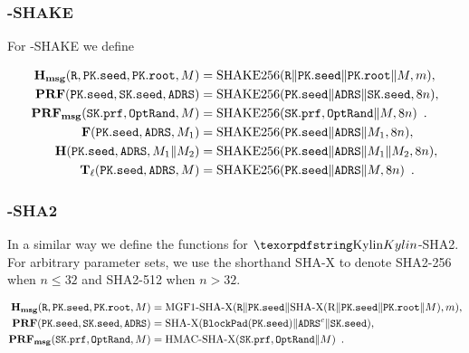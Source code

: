 \begin{table}[ht]
    \caption{Example parameter sets for \SPHINCSA\ targeting different security levels and different tradeoffs between size and speed. Note that these parameter sets have been update for round 3. The column labeled ``bitsec'' gives the bit security computed as described in Section 9; the column labeled ``sec level'' gives the security level according to the levels specified in Section 4. $\mathrm{A}.5$ of the Call for Proposals. As explained later,
    for Haraka the security level is limited to 2: i.e., it is 1 for $n=16$, and 2 for $n=24$ or $n=32.$}
\end{table}

\subsubsection{\SPHINCSA-SHAKE}

For \SPHINCSA-SHAKE we define

\begin{align*}
    \hashmsg (\randstr, \pk.\seed, \pk.\root, M)
        &=\text{SHAKE256}(\randstr \| \pk.\seed \| \pk.\root \| M, m), \\
    \PRF(\pk.\seed, \sk.\seed, \ADRS) &= \text{SHAKE256}(\pk.\seed \| \ADRS \| \sk.\seed,8n), \\
    \PRFmsg(\sk.\prf, \mathtt{OptRand}, M) &= \text{SHAKE256}(\sk.\prf, \mathtt{OptRand} \| M,8n) \enspace. \\
    \hashF(\pk.\seed, \ADRS, M_1) &= \text{SHAKE256}(\pk.\seed \| \ADRS \| M_{1},8n ), \\
    \hashH(\pk.\seed, \ADRS, M_1 \| M_2) &= \text{SHAKE256}(\pk.\seed \| \ADRS \| M_1 \| M_2,8n ), \\
    \Th_\ell (\pk.\seed, \ADRS, M) &= \text{SHAKE256}(\pk.\seed \| \ADRS \| M,8n) \enspace.
\end{align*}

 

\subsubsection{\SPHINCSA-SHA2}

In a similar way we define the functions for $\SPHINCSA$-SHA2. For arbitrary parameter sets, we use the shorthand SHA-X to denote SHA2-256 when $n\leq 32$ and SHA2-512 when $n>32$.

\begin{align*}
    \hashmsg (\randstr, \pk.\seed, \pk.\root, M)
        &=\text{MGF1-SHA-X}(\randstr \| \pk.\seed \| \text{SHA-X} (\mathrm{R}\|\pk.\seed\|\pk.\root \| M), m), \\
    \PRF(\pk.\seed, \sk.\seed, \ADRS) &= \text{SHA-X}(\mathtt{BlockPad}(\pk.\seed) \| \ADRS^c \| \sk.\seed), \\
    \PRFmsg(\sk.\prf, \mathtt{OptRand}, M) &= \text{HMAC-SHA-X}(\sk.\prf, \mathtt{OptRand} \| M) \enspace.
\end{align*}

